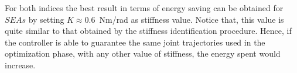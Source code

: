 For both indices the best result in terms of energy saving can be obtained for $SEAs$ by setting $K\approx 0.6$~Nm/rad as stiffness value. 
Notice that, this value is quite similar to that obtained by the stiffness identification procedure. Hence, if the controller is able to guarantee the same joint trajectories used in the optimization phase, with any other value of stiffness, the energy spent would increase.


% 
% 


